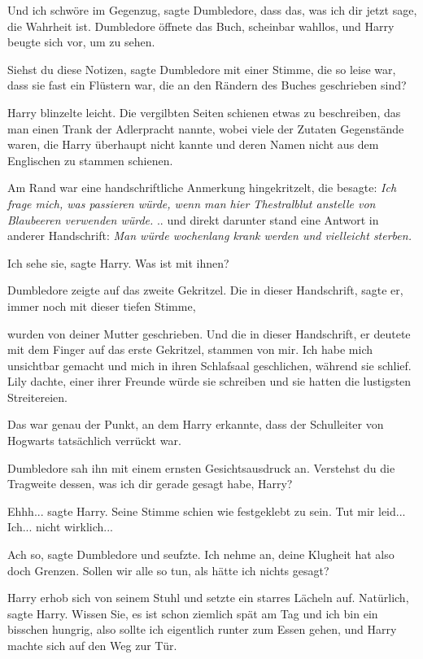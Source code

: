 \glqq Und ich schwöre im Gegenzug\grqq{}, sagte Dumbledore, \glqq dass das, was
ich dir jetzt sage, die Wahrheit ist.\grqq{} Dumbledore öffnete das Buch,
scheinbar wahllos, und Harry beugte sich vor, um zu sehen.

\glqq Siehst du diese Notizen\grqq{}, sagte Dumbledore mit einer Stimme, die so
leise war, dass sie fast ein Flüstern war, \glqq die an den Rändern des Buches
geschrieben sind?\grqq{}

Harry blinzelte leicht. Die vergilbten Seiten schienen etwas zu beschreiben, das
man einen Trank der Adlerpracht nannte, wobei viele der Zutaten Gegenstände
waren, die Harry überhaupt nicht kannte und deren Namen nicht aus dem Englischen
zu stammen schienen.

Am Rand war eine handschriftliche Anmerkung hingekritzelt, die besagte:
\emph{Ich frage mich, was passieren würde, wenn man hier Thestralblut anstelle
von Blaubeeren verwenden würde.} .. und direkt darunter stand eine Antwort in
anderer Handschrift: \emph{Man würde wochenlang krank werden und vielleicht
sterben.}

\glqq Ich sehe sie\grqq{}, sagte Harry. \glqq Was ist mit ihnen?\grqq{}

Dumbledore zeigte auf das zweite Gekritzel. \glqq Die in dieser
Handschrift\grqq{}, sagte er, immer noch mit dieser tiefen Stimme,

\glqq wurden von deiner Mutter geschrieben. Und die in dieser
Handschrift\grqq{}, er deutete mit dem Finger auf das erste Gekritzel, \glqq
stammen von mir. Ich habe mich unsichtbar gemacht und mich in ihren Schlafsaal
geschlichen, während sie schlief. Lily dachte, einer ihrer Freunde würde sie
schreiben und sie hatten die lustigsten Streitereien.\grqq{}

Das war genau der Punkt, an dem Harry erkannte, dass der Schulleiter von
Hogwarts tatsächlich verrückt war.

Dumbledore sah ihn mit einem ernsten Gesichtsausdruck an. \glqq Verstehst du die
Tragweite dessen, was ich dir gerade gesagt habe, Harry?\grqq{}

\glqq Ehhh...\grqq{} sagte Harry. Seine Stimme schien wie festgeklebt zu sein.
\glqq Tut mir leid... Ich... nicht wirklich...\grqq{}

\glqq Ach so\grqq{}, sagte Dumbledore und seufzte. \glqq Ich nehme an, deine
Klugheit hat also doch Grenzen. Sollen wir alle so tun, als hätte ich nichts
gesagt?\grqq{}

Harry erhob sich von seinem Stuhl und setzte ein starres Lächeln auf. \glqq
Natürlich\grqq{}, sagte Harry. \glqq Wissen Sie, es ist schon ziemlich spät am
Tag und ich bin ein bisschen hungrig, also sollte ich eigentlich runter zum
Essen gehen\grqq{}, und Harry machte sich auf den Weg zur Tür.


